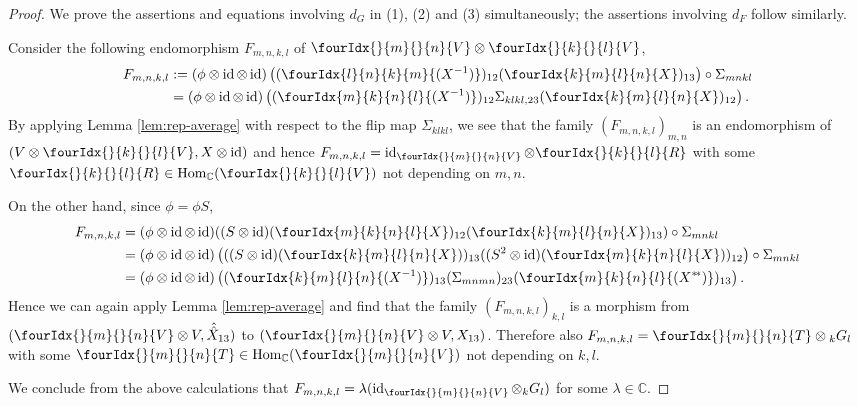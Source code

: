 \documentclass[10pt]{article}
\DeclareMathOperator{\id}{id}
\DeclareMathOperator{\Hom}{Hom}
\newcommand{\dual}[1]{#1^{*}}
\newcommand{\C}{\mathbb{C}}
\newcommand{\GrDA}[3]{{}_{#2}#1_{#3}} %
\newcommand{\Gr}[5]{\fourIdx{#2}{#4}{#3}{#5}{#1}}%
\newcommand{\Gru}[3]{\Gr{#1}{}{}{#2}{#3}}
\theoremstyle{definition}
\numberwithin{equation}{section}
\begin{document}
\begin{proof}
  We prove the assertions and equations involving $d_G$ in (1), (2)
  and (3)  simultaneously; the assertions involving $d_F$  follow similarly.

  Consider
  the following endomorphism $F_{m,n,k,l}$ of $\Gru{V}{m}{n}\otimes \Gru{V}{k}{l}$, 
  \begin{align*}
    F_{m,n,k,l}
    &:=(\phi \otimes \id \otimes \id)\left((\Gr{(X^{-1})}{l}{k}{n}{m})_{12}(\Gr{X}{k}{l}{m}{n})_{13}\right)
    \circ \Sigma_{mnkl} \\ &= (\phi \otimes \id \otimes
    \id)\left((\Gr{(X^{-1})}{m}{n}{k}{l})_{12}
      \Sigma_{klkl,23}(\Gr{X}{k}{l}{m}{n})_{12}\right).
  \end{align*}
  By applying Lemma \ref{lem:rep-average} with respect to the flip map $\Sigma_{klkl}$, we see that the family $(F_{m,n,k,l})_{m,n}$ is
  an endomorphism of $(V \otimes \Gru{V}{k}{l}, X\otimes \id)$ and hence
  $F_{m,n,k,l} = \id_{\Gru{V}{m}{n}} \otimes \Gru{R}{k}{l}$ with some $\Gru{R}{k}{l} \in \Hom_{\C}(\Gru{V}{k}{l})$ not
  depending on $m,n$. 
  
  On the other hand, since $\phi = \phi S$,
  \begin{align*}
    F_{m,n,k,l} &= (\phi \otimes \id \otimes \id)((S \otimes
    \id)(\Gr{X}{m}{n}{k}{l})_{12}(\Gr{X}{k}{l}{m}{n})_{13})
    \circ \Sigma_{mnkl} \\
    &= (\phi \otimes \id \otimes \id)\left(((S \otimes
      \id)(\Gr{X}{k}{l}{m}{n}))_{13}
      ((S^{2} \otimes \id)(\Gr{X}{m}{n}{k}{l}))_{12}\right)     \circ \Sigma_{mnkl}\\
    &= (\phi \otimes \id \otimes
    \id)\left((\Gr{(X^{-1})}{k}{l}{m}{n})_{13} (\Sigma_{mnmn})_{23}
      (\Gr{(\dual{\dual{X}{}\!})}{m}{n}{k}{l})_{13}\right).
  \end{align*}
  Hence we can again apply Lemma \ref{lem:rep-average} and
  find that the family $(F_{m,n,k,l})_{k,l}$ is a morphism from $(\Gru{V}{m}{n} \otimes V, \hat{\hat{X}}_{13})$ to $(\Gru{V}{m}{n} \otimes V,
 X_{13})$. Therefore also $F_{m,n,k,l} = \Gru{T}{m}{n} \otimes \GrDA{G}{k}{l}$
  with some $\Gru{T}{m}{n} \in \mathcal{\Hom_{\C}}(\Gru{V}{m}{n})$
  not depending on $k,l$. 
  
  We conclude from the above calculations that $F_{m,n,k,l} = \lambda
  (\id_{\Gru{V}{m}{n}} \otimes \GrDA{G}{k}{l})$  for some $\lambda\in \C$.
   

\end{proof}
\end{document}
